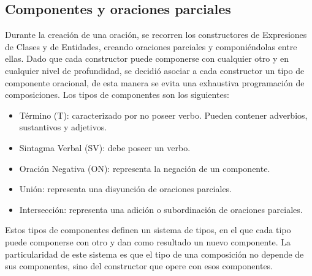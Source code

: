 \subsection{Componentes y oraciones parciales}
Durante la creación de una oración, se recorren los constructores de Expresiones de Clases y de Entidades, creando oraciones parciales y componiéndolas entre ellas. Dado que cada constructor puede componerse con cualquier otro y en cualquier nivel de profundidad, se decidió asociar a cada constructor un tipo de componente oracional, de esta manera se evita una exhaustiva programación de composiciones.
Los tipos de componentes son los siguientes:
\begin{itemize}
    \item Término (T): caracterizado por no poseer verbo. Pueden contener adverbios, sustantivos y adjetivos.
    \item Sintagma Verbal (SV): debe poseer un verbo.
    \item Oración Negativa (ON): representa la negación de un componente.
    \item Unión: representa una disyunción de oraciones parciales.
    \item Intersección: representa una adición o subordinación de oraciones parciales.
\end{itemize}

Estos tipos de componentes definen un sistema de tipos, en el que cada tipo puede componerse con otro y dan como resultado un nuevo componente. La particularidad de este sistema es que el tipo de una composición no depende de sus componentes, sino del constructor que opere con esos componentes.

